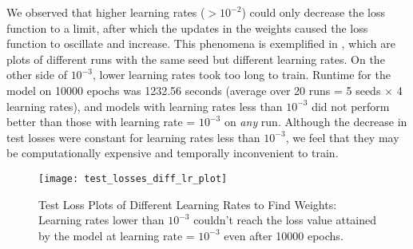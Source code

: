 We observed that higher learning rates ($>10^{-2}$) could only decrease the loss function to a limit, after which the updates in the weights caused the loss function to oscillate and increase. This phenomena is exemplified in , which are plots of different runs with the same seed but different learning rates. On the other side of $10^{-3}$, lower learning rates took too long to train. Runtime for the model on 10000 epochs was 1232.56 seconds (average over 20 runs = 5 seeds $\times$ 4 learning rates), and models with learning rates less than $10^{-3}$ did not perform better than those with learning rate = $10^{-3}$ on \textit{any} run. Although the decrease in test losses were constant for learning rates less than $10^{-3}$, we feel that they may be computationally expensive and temporally inconvenient to train.
\begin{figure}[!htbp]
    \centering
    \texttt{[image: test\_losses\_diff\_lr\_plot]}
    \caption[Test Loss Plots of Different Learning Rates to Find Weights]{Test Loss Plots of Different Learning Rates to Find Weights: Learning rates lower than $10^{-3}$ couldn't reach the loss value attained by the model at learning rate = $10^{-3}$ even after 10000 epochs.}
    \label{fig:Test Loss Plots of Different Learning Rates to Find Weights}
\end{figure}
